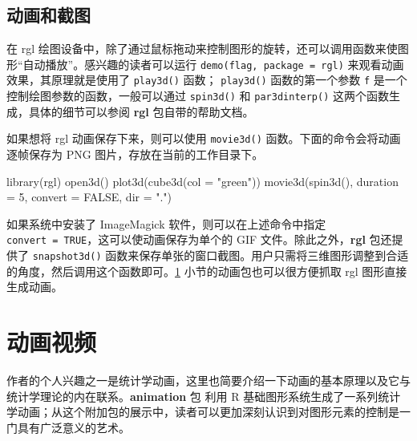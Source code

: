 \documentclass[
  b5paper,
  UTF8,twoside]{book}
\newenvironment{Shaded}{\begin{snugshade}}{\end{snugshade}}
\newcommand{\AttributeTok}[1]{\textcolor[rgb]{0.77,0.63,0.00}{#1}}
\newcommand{\ConstantTok}[1]{\textcolor[rgb]{0.00,0.00,0.00}{#1}}
\newcommand{\DecValTok}[1]{\textcolor[rgb]{0.00,0.00,0.81}{#1}}
\newcommand{\FunctionTok}[1]{\textcolor[rgb]{0.00,0.00,0.00}{#1}}
\newcommand{\NormalTok}[1]{#1}
\newcommand{\StringTok}[1]{\textcolor[rgb]{0.31,0.60,0.02}{#1}}
\begin{document}
\hypertarget{ux52a8ux753bux548cux622aux56fe}{%
\subsection{动画和截图}\label{ux52a8ux753bux548cux622aux56fe}}

在 rgl 绘图设备中，除了通过鼠标拖动来控制图形的旋转，还可以调用函数来使图形``自动播放''。感兴趣的读者可以运行 \texttt{demo(\textquotesingle{}flag\textquotesingle{},\ package\ =\ \textquotesingle{}rgl\textquotesingle{})} 来观看动画效果，其原理就是使用了 \texttt{play3d()} 函数； \texttt{play3d()} 函数的第一个参数 \texttt{f} 是一个控制绘图参数的函数，一般可以通过 \texttt{spin3d()} 和 \texttt{par3dinterp()} 这两个函数生成，具体的细节可以参阅 \textbf{rgl} 包自带的帮助文档。

如果想将 rgl 动画保存下来，则可以使用 \texttt{movie3d()} 函数。下面的命令会将动画逐帧保存为 PNG 图片，存放在当前的工作目录下。

\begin{Shaded}
\begin{Highlighting}[]
\FunctionTok{library}\NormalTok{(rgl)}
\FunctionTok{open3d}\NormalTok{()}
\FunctionTok{plot3d}\NormalTok{(}\FunctionTok{cube3d}\NormalTok{(}\AttributeTok{col =} \StringTok{"green"}\NormalTok{))}
\FunctionTok{movie3d}\NormalTok{(}\FunctionTok{spin3d}\NormalTok{(), }\AttributeTok{duration =} \DecValTok{5}\NormalTok{, }\AttributeTok{convert =} \ConstantTok{FALSE}\NormalTok{, }\AttributeTok{dir =} \StringTok{"."}\NormalTok{)}
\end{Highlighting}
\end{Shaded}

如果系统中安装了 ImageMagick 软件，则可以在上述命令中指定 \texttt{convert\ =\ TRUE}，这可以使动画保存为单个的 GIF 文件。除此之外，\textbf{rgl} 包还提供了 \texttt{snapshot3d()} 函数来保存单张的窗口截图。用户只需将三维图形调整到合适的角度，然后调用这个函数即可。\ref{sec:animation} 小节的动画包也可以很方便抓取 rgl 图形直接生成动画。

\hypertarget{sec:animation}{%
\section{动画视频}\label{sec:animation}}

作者的个人兴趣之一是统计学动画，这里也简要介绍一下动画的基本原理以及它与统计学理论的内在联系。\textbf{animation} 包 \citep{animation} 利用 R 基础图形系统生成了一系列统计学动画；从这个附加包的展示中，读者可以更加深刻认识到对图形元素的控制是一门具有广泛意义的艺术。
\end{document}
